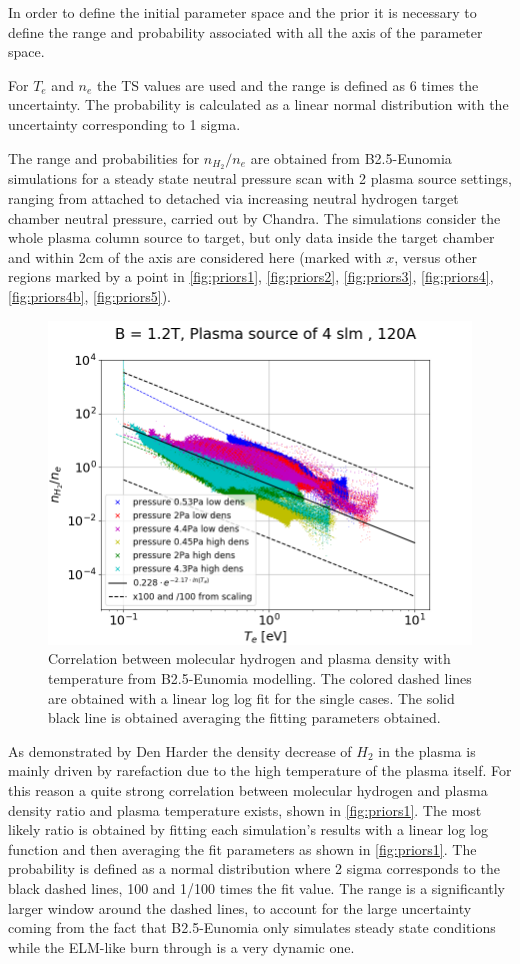 In order to define the initial parameter space and the prior it is necessary to define the range and probability associated with all the axis of the parameter space.

For $T_e$ and $n_e$ the TS values are used and the range is defined as 6 times the uncertainty. The probability is calculated as a linear normal distribution with the uncertainty corresponding to 1 sigma.

The range and probabilities for $n_{H_2}/n_e$ are obtained from B2.5-Eunomia simulations for a steady state neutral pressure scan with 2 plasma source settings, ranging from attached to detached via increasing neutral hydrogen target chamber neutral pressure, carried out by Chandra.\cite{Chandra2021,Chandra2022} The simulations consider the whole plasma column source to target, but only data inside the target chamber and within 2cm of the axis are considered here (marked with $x$, versus other regions marked by a point in \autoref{fig:priors1}, \ref{fig:priors2}, \ref{fig:priors3}, \ref{fig:priors4}, \ref{fig:priors4b}, \ref{fig:priors5}).

\begin{figure}
	\centering
	\includegraphics[width=0.7\linewidth,trim={0 0 30 45},clip]{Chapters/chapter3/figs/nH2_ne3.png}
	\caption{Correlation between molecular hydrogen and plasma density with temperature from B2.5-Eunomia modelling. The colored dashed lines are obtained with a linear log log fit for the single cases. The solid black line is obtained averaging the fitting parameters obtained.}
	\label{fig:priors1}
\end{figure}


As demonstrated by Den Harder\cite{DenHarder2015} the density decrease of $H_2$ in the plasma is mainly driven by rarefaction due to the high temperature of the plasma itself. For this reason a quite strong correlation between molecular hydrogen and plasma density ratio  and plasma temperature exists, shown in \autoref{fig:priors1}. The most likely ratio is obtained by fitting each simulation's results with a linear log log function and then averaging the fit parameters as shown in \autoref{fig:priors1}. The probability is defined as a normal distribution where 2 sigma corresponds to the black dashed lines, 100 and 1/100 times the fit value. The range is a significantly larger window around the dashed lines, to account for the large uncertainty coming from the fact that B2.5-Eunomia only simulates steady state conditions while the ELM-like burn through is a very dynamic one.

